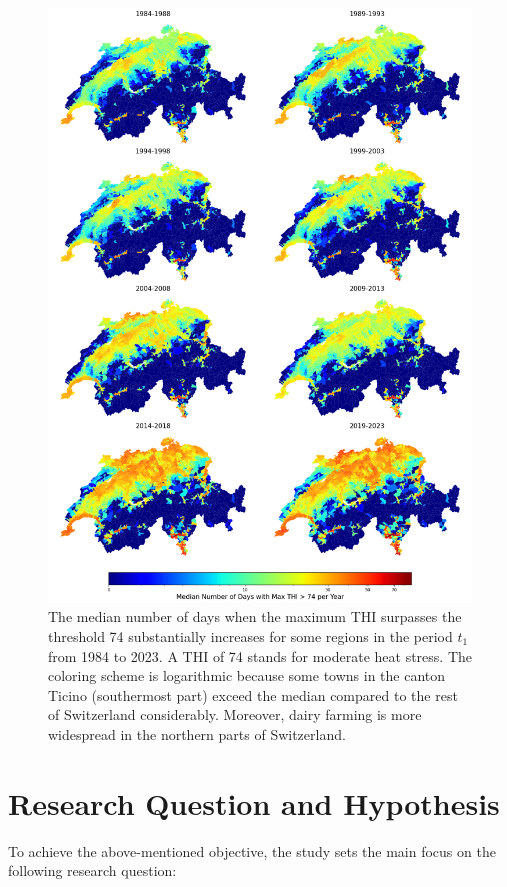 \begin{figure}[H]
    \centering
    \includegraphics[width=\textwidth]{figures/00_thi_above_80/thi_above_74.png}
    \caption{The median number of days when the maximum THI surpasses the threshold 74 substantially increases for some regions in the period $t_1$ from 1984 to 2023. A THI of 74 stands for moderate heat stress. The coloring scheme is logarithmic because some towns in the canton Ticino (southermost part) exceed the median compared to the rest of Switzerland considerably. Moreover, dairy farming is more widespread in the northern parts of Switzerland.}
    \label{fig:thi_80}
\end{figure}

\section{Research Question and Hypothesis}\label{sec:research_question}
To achieve the above-mentioned objective, the study sets the main focus on the following research question:

